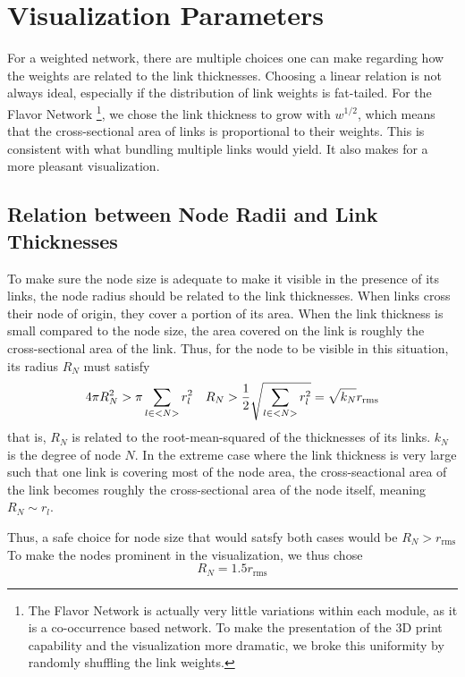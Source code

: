 \documentclass[nofootinbib,preprint,floatfix,titlepage,superscriptaddress]{revtex4} %
\begin{document}
\section{Visualization Parameters\label{ap:params}}
For a weighted network, there are multiple choices one can make regarding how the weights are related to the link thicknesses.
Choosing a linear relation is not always ideal, especially if the distribution of link weights is fat-tailed. 
For the Flavor Network \citep{ahn2011flavor}\footnote{The Flavor Network is actually very little variations within each module, as it is a co-occurrence based network. To make the presentation of the 3D print capability and the visualization more dramatic, we broke this uniformity by randomly shuffling the link weights.}, we chose the link thickness to grow with $w^{1/2}$, which means that the cross-sectional area of links is proportional to their weights. 
This is consistent with what bundling multiple links would yield. 
It also makes for a more pleasant visualization. 

\subsection{Relation between Node Radii and Link Thicknesses}
To make sure the node size is adequate to make it visible in the presence of its links, the node radius should be related to the link thicknesses. 
When links cross their node of origin, they cover a portion of its area.
When the link thickness is small compared to the node size, the area covered on the link is roughly the cross-sectional area of the link. 
Thus, for the node to be visible in this situation, its radius $R_N$ must satisfy
\begin{equation}
    4 \pi R_N^2 > \pi \sum_{l\in <N>} r_l^2 \quad R_N > {1\over 2} \sqrt{\sum_{l\in <N>} r_l^2} = \sqrt{k_N} r_{\mathrm{rms}}  
\end{equation}
that is, $R_N$ is related to the root-mean-squared of the thicknesses of its links. $k_N$ is the degree of node $N$.  
In the extreme case where the link thickness is very large such that one link is covering most of the node area, the cross-seactional area of the link becomes roughly the cross-sectional area of the node itself, meaning $R_N \sim r_l$. 

Thus, a safe choice for node size that would satsfy both cases would be 
$R_N > r_{\mathrm{rms}}$
To make the nodes prominent in the visualization, we thus chose 
\[R_N = 1.5 r_{\mathrm{rms}}\]
\end{document}
